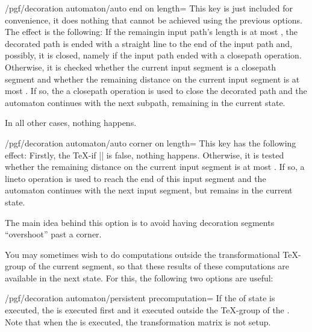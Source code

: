 \begin{command}{\pgfdeclaredecoration{}}
\begin{command}{\state{}}
    \begin{key}{/pgf/decoration automaton/auto end on length=}
      This key is just included for convenience, it does nothing that
      cannot be achieved using the previous options. The effect is the
      following: If the remaingin input path's length is at most
      , the decorated path is ended with a straight
      line to the end of the input path and, possibly, it is closed,
      namely if the input path ended with a closepath
      operation. Otherwise, it is checked whether the current input
      segment is a closepath segment and whether the remaining
      distance on the current input segment is at most
      . If so, the a closepath operation is used to
      close the decorated path and the automaton continues with the
      next subpath, remaining in the current state.

      In all other cases, nothing happens.
    \end{key}

    \begin{key}{/pgf/decoration automaton/auto corner on length=}
      This key has the following effect: Firstly, the \TeX-if
      |\ifpgfdecoratepathhascorners| is false, nothing
      happens. Otherwise, it is tested whether the remaining distance
      on the current input segment is at most . If so,
      a lineto operation is used to reach the end of this input
      segment and the automaton continues with the next input segment,
      but remains in the current state.

      The main idea behind this option is to avoid having decoration
      segments ``overshoot'' past a corner.
    \end{key}

    You may sometimes wish to do computations outside the
    transformational \TeX-group of the current segment,
    so that these results of these computations are available in the
    next state. For this, the following two options are useful:
    
    \begin{key}{/pgf/decoration automaton/persistent precomputation=}
      If the  of state is executed, the  is
      executed first and it executed outside the \TeX-group of the
      . Note that when the  is executed, the
      transformation matrix is not setup.
    \end{key}


\end{command}
\end{command}

